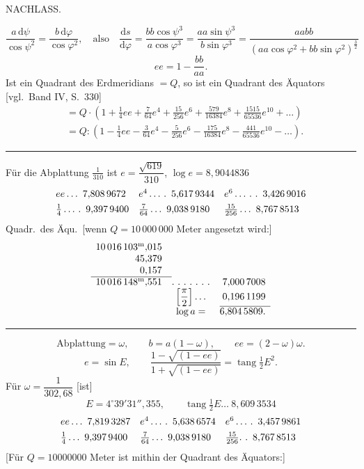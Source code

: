 \clearpage
{}\hfill NACHLASS.\hfill\mbox{}\par
\[
\frac{a\,\mathrm d\psi}{\cos\psi^2}=\frac{b\,\mathrm d\varphi}{\cos\varphi^2},\quad\text{also}\quad\frac{\mathrm ds}{\mathrm d\varphi}=\frac{bb\cos\psi^3}{a\cos\varphi^3}=\frac{aa\sin\psi^3}{b\sin\varphi^3}=\frac{aabb}{(aa\cos\varphi^2+bb\sin\varphi^2)^{\frac32}}
\]
\[
ee=1-\frac{bb}{aa}.
\]
Ist ein Quadrant des Erdmeridians $=Q$, so ist ein Quadrant des Äquators [vgl.\ Band IV, S.\ 330]
\[
\begin{aligned}
&=Q\cdot(1+\tfrac14ee+\tfrac7{64}e^4+\tfrac{15}{256}e^6+\tfrac{579}{16384}e^8+\tfrac{1515}{65536}e^{10}+\ldots)\\
&=Q:(1-\tfrac14ee-\tfrac3{64}e^4-\tfrac5{256}e^6-\tfrac{175}{16384}e^8-\tfrac{441}{65536}e^{10}-\ldots).
\end{aligned}
\]
\begin{center}\rule{.25\textwidth}{.4pt}\end{center}
Für die Abplattung $\tfrac1{310}$ ist $e=\dfrac{\sqrt{619}}{310}$, $\log e=8{,}9044836$
\[
\begin{array}{l@{\quad}l@{\quad}l}
ee\ldots\ 7{,}808\,9672&e^4\ldots\,\ldotp\ 5{,}617\,9344&e^6\ldots\,\ldotp\,\ldotp\ 3{,}426\,9016\\[4pt]
\tfrac14\ldots\,\ldotp\ 9{,}397\,9400&\tfrac7{64}\ldots\ 9{,}038\,9180&\tfrac{15}{256}\ldots\ 8{,}767\,8513
\end{array}
\]
Quadr.\ des Äqu.\ [wenn $Q=10\,000\,000$ Meter angesetzt wird:]
\[
\begin{array}{r@{\quad}c@{\quad}r}
10\,016\,103^{\mathrm m}{,}015&&\\
45{,}379&&\\
0{,}157&&\\\cline{1-1}
10\,016\,148^{\mathrm m}{,}551&\ldotp\,\ldotp\,\ldotp\,\ldotp\,\ldotp\,\ldotp\,\ldotp&7{,}000\,7008\\
&\left[\dfrac\pi2\right]\ldots&0{,}196\,1199\\\cline{3-3}
&\log a=&6{,}804\,5809.
\end{array}
\]
\begin{center}\rule{.25\textwidth}{.4pt}\end{center}
\[
\text{Abplattung}=\omega,\qquad b=a(1-\omega),\qquad ee=(2-\omega)\omega.
\]
\[
e=\sin E,\qquad\frac{1-\sqrt{(1-ee)}}{1+\sqrt{(1-ee)}}=\operatorname{tang}\tfrac12E^2.
\]
Für $\omega=\dfrac1{302{,}68}$ [ist]
\[
E=4^\circ39'31''{,}355,\qquad\operatorname{tang}\tfrac12E\ldots\ 8{,}609\,3534
\]
\[
\begin{array}{l@{\quad}l@{\quad}l}
ee\ldots\ 7{,}819\,3287&e^4\ldots\,\ldotp\ 5{,}638\,6574&e^6\ldots\,\ldotp\ 3{,}457\,9861\\[4pt]
\tfrac14\ldots\ 9{,}397\,9400&\tfrac7{64}\ldots\ 9{,}038\,9180&\tfrac{15}{256}\ldotp\,\ldotp\ 8{,}767\,8513
\end{array}
\]
[Für $Q=10000000$ Meter ist mithin der Quadrant des Äquators:]

